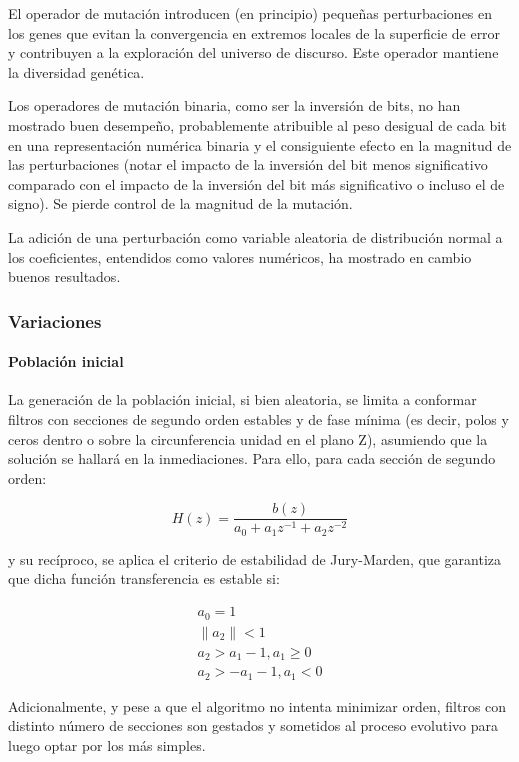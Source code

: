 \documentclass[11pt, journal]{IEEEtran}
\begin{document}
El operador de mutación introducen (en principio) pequeñas
perturbaciones en los genes que evitan la convergencia en extremos
locales de la superficie de error y contribuyen a la exploración del
universo de discurso. Este operador mantiene la diversidad genética.

Los operadores de mutación binaria, como ser la inversión de bits, no
han mostrado buen desempeño, probablemente atribuible al peso desigual
de cada bit en una representación numérica binaria y el consiguiente
efecto en la magnitud de las perturbaciones (notar el impacto de la
inversión del bit menos significativo comparado con el impacto de la
inversión del bit más significativo o incluso el de signo). Se pierde
control de la magnitud de la mutación.

La adición de una perturbación como variable aleatoria de distribución
normal a los coeficientes, entendidos como valores numéricos, ha
mostrado en cambio buenos resultados.

\subsubsection{Variaciones}

\paragraph{Población inicial}

La generación de la población inicial, si bien aleatoria, se limita a
conformar filtros con secciones de segundo orden estables y de fase
mínima (es decir, polos y ceros dentro o sobre la circunferencia unidad
en el plano Z), asumiendo que la solución se hallará en la
inmediaciones. Para ello, para cada sección de segundo orden:

\begin{equation*}
H(z) = \frac{b(z)}{a_0 + a_1 z^{-1} + a_2 z^{-2}}
\end{equation*}

y su recíproco, se aplica el criterio de estabilidad de Jury-Marden, que
garantiza que dicha función transferencia es estable si:

\begin{gather*}
a_0 = 1 \\
\|a_2\| < 1 \\
a_2 > a_1 - 1, a_1 \geq 0 \\
a_2 > -a_1 - 1, a_1 < 0
\end{gather*}

Adicionalmente, y pese a que el algoritmo no intenta minimizar orden,
filtros con distinto número de secciones son gestados y sometidos al
proceso evolutivo para luego optar por los más simples.
\end{document}
